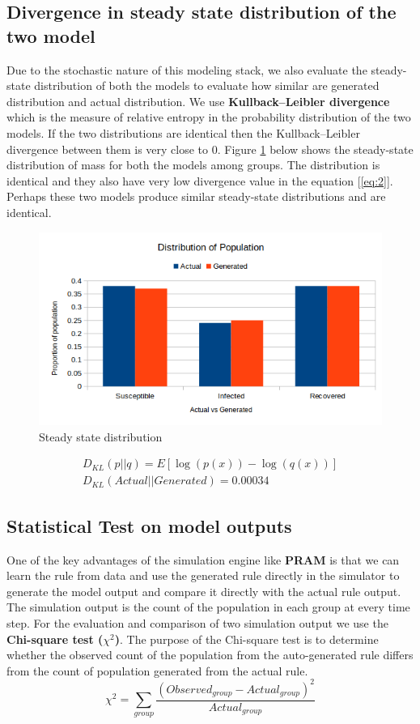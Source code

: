 \documentclass[11pt, a4paper]{article} %
\begin{document}
\subsection{Divergence in steady state distribution of the two model}
Due to the stochastic nature of this modeling stack, we also evaluate the steady-state distribution of both the models to evaluate how similar are generated distribution and actual distribution. We use \textbf{Kullback–Leibler divergence} which is the measure of relative entropy in the probability distribution of the two models. If the two distributions are identical then the Kullback–Leibler divergence between them is very close to 0. Figure \ref{fig:dist} below shows the steady-state distribution of mass for both the models among groups. The distribution is identical and they also have very low divergence value in the equation [\ref{eq:2}]. Perhaps these two models produce similar steady-state distributions and are identical. 
\begin{figure}[h!]
	\includegraphics[scale=1]{proportionCompare.png}
	\caption{Steady state distribution}
	\label{fig:dist}
\end{figure}
\begin{equation}\label{eq:2}
\begin{gathered}
D_{KL} (p||q) = E[\log(p(x)) - \log(q(x))] \\
D_{KL} (Actual||Generated) =  0.00034
\end{gathered}
\end{equation}

\subsection{Statistical Test on model outputs}
One of the key advantages of the simulation engine like \textbf{PRAM} is that we can learn the rule from data and use the generated rule directly in the simulator to generate the model output and compare it directly with the actual rule output. The simulation output is the count of the population in each group at every time step. For the evaluation and comparison of two simulation output we use the \textbf{Chi-square test ($\chi^2$)}. The purpose of the Chi-square test is to determine whether the observed count of the population from the auto-generated rule differs from the count of population generated from the actual rule.
\begin{equation}
\chi^2 = \sum_{group}\frac{(Observed_{group} - Actual_{group})^2}{Actual_{group}}
\end{equation}
\end{document}
